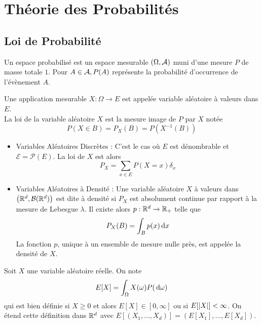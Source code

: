 \documentclass{cours}
\begin{document}
\section{Théorie des Probabilités}
\subsection{Loi de Probabilité}
\begin{definition}
    Un espace probabilisé est un espace mesurable $\left(\Omega, \mathcal{A}\right)$ muni d'une mesure $P$ de masse totale $1$. Pour $A\in \mathcal{A}, P(A)$ représente la probabilité d'occurrence de l'évènement $A$.
\end{definition}

\begin{definition}
    Une application mesurable $X : \Omega \rightarrow E$ est appelée variable aléatoire à valeurs dans $E$. \\
    La loi de la variable aléatoire $X$ est la mesure image de $P$ par $X$ notée
    \[
        P(X\in B) = P_{X}(B)= P\left(X^{-1}(B)\right)
    \]
\end{definition}

\begin{definition}
    \begin{itemize}
        \item Variables Aléatoires Discrètes : C'est le cas où $E$ est dénombrable et $\mathcal{E} = \mathcal{P}(E)$. La loi de $X$ est alors \[P_{X} = \sum_{x \in E}P(X = x)\delta_{x}\]
        \item Variables Aléatoires à Densité : Une variable aléatoire $X$ à valeurs dans $\left(\mathbb{R}^{d}, \mathcal{B}(\mathbb{R}^{d})\right)$ est dite à densité si $P_{X}$ est absolument continue par rapport à la mesure de Lebesgue $\lambda$. Il existe alors $p : \mathbb{R}^{d} \rightarrow \mathbb{R}_{+}$ telle que \[P_{X}(B) = \int_{B}p(x){\rm \, d} x\] La fonction $p$, unique à un ensemble de mesure nulle près, est appelée la densité de $X$.
    \end{itemize}
\end{definition}

\begin{definition}
    Soit $X$ une variable aléatoire réelle. On note \[E[X] = \int_{\Omega}X(\omega)P({\rm \, d} \omega)\]
    qui est bien définie si $X \geq 0$ et alors $E[X] \in \left[0, \infty\right]$ ou si $E[\left|X\right|] < \infty$. On étend cette définition dans $\mathbb{R}^{d}$ avec $E\left[\left(X_{1}, \ldots, X_{d}\right)\right] = \left(E[X_{1}], \ldots, E[X_{d}]\right)$.
\end{definition}
\end{document}
